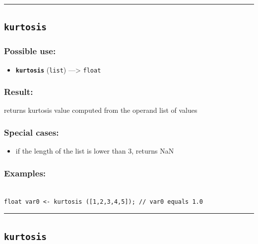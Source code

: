 \documentclass[]{book}
\providecommand{\tightlist}{%
  \setlength{\itemsep}{0pt}\setlength{\parskip}{0pt}}
\theoremstyle{definition}
\theoremstyle{definition}
\theoremstyle{definition}
\theoremstyle{remark}
\begin{document}
\begin{center}\rule{0.5\linewidth}{\linethickness}\end{center}

\subsection{\texorpdfstring{\texttt{kurtosis}}{kurtosis}}\label{kurtosis}

\subsubsection{Possible use:}\label{possible-use-314}

\begin{itemize}
\tightlist
\item
  \textbf{\texttt{kurtosis}} (\texttt{list}) ---\textgreater{}
  \texttt{float}
\end{itemize}

\subsubsection{Result:}\label{result-304}

returns kurtosis value computed from the operand list of values

\subsubsection{Special cases:}\label{special-cases-83}

\begin{itemize}
\tightlist
\item
  if the length of the list is lower than 3, returns NaN
\end{itemize}

\subsubsection{Examples:}\label{examples-221}

\begin{verbatim}
 
float var0 <- kurtosis ([1,2,3,4,5]); // var0 equals 1.0
\end{verbatim}

\begin{center}\rule{0.5\linewidth}{\linethickness}\end{center}

\subsection{\texorpdfstring{\texttt{kurtosis}}{kurtosis}}\label{kurtosis-1}
\end{document}
